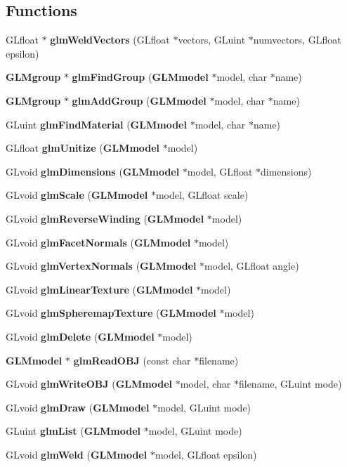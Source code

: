 \subsection*{Functions}
\begin{DoxyCompactItemize}
\item 
G\-Lfloat $\ast$ {\bf glm\-Weld\-Vectors} (G\-Lfloat $\ast$vectors, G\-Luint $\ast$numvectors, G\-Lfloat epsilon)
\item 
{\bf G\-L\-Mgroup} $\ast$ {\bf glm\-Find\-Group} ({\bf G\-L\-Mmodel} $\ast$model, char $\ast$name)
\item 
{\bf G\-L\-Mgroup} $\ast$ {\bf glm\-Add\-Group} ({\bf G\-L\-Mmodel} $\ast$model, char $\ast$name)
\item 
G\-Luint {\bf glm\-Find\-Material} ({\bf G\-L\-Mmodel} $\ast$model, char $\ast$name)
\item 
G\-Lfloat {\bf glm\-Unitize} ({\bf G\-L\-Mmodel} $\ast$model)
\item 
G\-Lvoid {\bf glm\-Dimensions} ({\bf G\-L\-Mmodel} $\ast$model, G\-Lfloat $\ast$dimensions)
\item 
G\-Lvoid {\bf glm\-Scale} ({\bf G\-L\-Mmodel} $\ast$model, G\-Lfloat scale)
\item 
G\-Lvoid {\bf glm\-Reverse\-Winding} ({\bf G\-L\-Mmodel} $\ast$model)
\item 
G\-Lvoid {\bf glm\-Facet\-Normals} ({\bf G\-L\-Mmodel} $\ast$model)
\item 
G\-Lvoid {\bf glm\-Vertex\-Normals} ({\bf G\-L\-Mmodel} $\ast$model, G\-Lfloat angle)
\item 
G\-Lvoid {\bf glm\-Linear\-Texture} ({\bf G\-L\-Mmodel} $\ast$model)
\item 
G\-Lvoid {\bf glm\-Spheremap\-Texture} ({\bf G\-L\-Mmodel} $\ast$model)
\item 
G\-Lvoid {\bf glm\-Delete} ({\bf G\-L\-Mmodel} $\ast$model)
\item 
{\bf G\-L\-Mmodel} $\ast$ {\bf glm\-Read\-O\-B\-J} (const char $\ast$filename)
\item 
G\-Lvoid {\bf glm\-Write\-O\-B\-J} ({\bf G\-L\-Mmodel} $\ast$model, char $\ast$filename, G\-Luint mode)
\item 
G\-Lvoid {\bf glm\-Draw} ({\bf G\-L\-Mmodel} $\ast$model, G\-Luint mode)
\item 
G\-Luint {\bf glm\-List} ({\bf G\-L\-Mmodel} $\ast$model, G\-Luint mode)
\item 
G\-Lvoid {\bf glm\-Weld} ({\bf G\-L\-Mmodel} $\ast$model, G\-Lfloat epsilon)
\end{DoxyCompactItemize}



